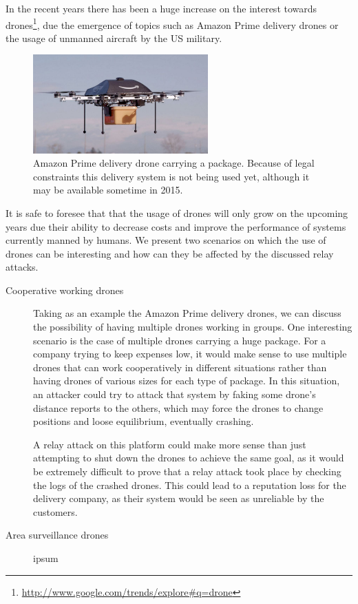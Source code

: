 \documentclass{article}
\begin{document}
In the recent years there has been a huge increase on the interest towards drones\footnote{\url{http://www.google.com/trends/explore#q=drone}}, due the emergence of topics such as Amazon Prime delivery drones or the usage of unmanned aircraft by the US military.


\begin{figure}[h!]
  \centering
    \includegraphics[width=0.6\textwidth]{images/amazonprimedrone.png}
  \caption{Amazon Prime delivery drone carrying a package. Because of legal constraints this delivery system is not being used yet, although it may be available sometime in 2015.\protect\footnotemark[5]}
  \label{fig:attackexample1}
\end{figure}

\addtocounter{footnote}{1}

It is safe to foresee that that the usage of drones will only grow on the upcoming years due their ability to decrease costs and improve the performance of systems currently manned by humans. We present two scenarios on which the use of drones can be interesting and how can they be affected by the discussed relay attacks.

\begin{description}
  \item[Cooperative working drones] Taking as an example the Amazon Prime delivery drones, we can discuss the possibility of having multiple drones working in groups. One interesting scenario is the case of multiple drones carrying a huge package. For a company trying to keep expenses low, it would make sense to use multiple drones that can work cooperatively in different situations rather than having drones of various sizes for each type of package. In this situation, an attacker could try to attack that system by faking some drone's distance reports to the others, which may force the drones to change positions and loose equilibrium, eventually crashing.
 
  A relay attack on this platform could make more sense than just attempting to shut down the drones to achieve the same goal, as it would be extremely difficult to prove that a relay attack took place by checking the logs of the crashed drones. This could lead to a reputation loss for the delivery company, as their system would be seen as unreliable by the customers.
  \item[Area surveillance drones] ipsum
\end{description}
\end{document}

